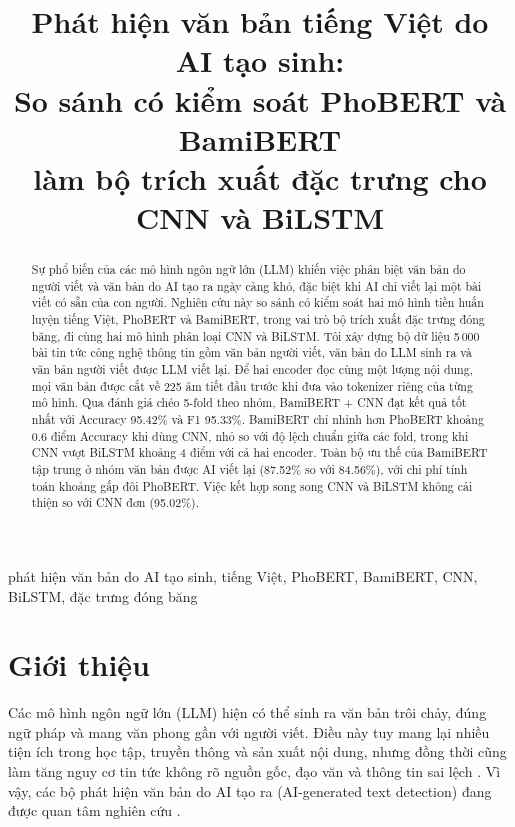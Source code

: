 \documentclass[conference,a4paper]{IEEEtran}
\begin{document}
\title{Phát hiện văn bản tiếng Việt do AI tạo sinh:\\
So sánh có kiểm soát PhoBERT và BamiBERT\\ làm bộ trích xuất đặc trưng cho CNN và BiLSTM}

\author{
}

\maketitle

\begin{abstract}
Sự phổ biến của các mô hình ngôn ngữ lớn (LLM) khiến việc phân biệt văn bản do người viết và văn bản do AI tạo ra ngày càng khó, đặc biệt khi AI chỉ viết lại một bài viết có sẵn của con người. Nghiên cứu này so sánh có kiểm soát hai mô hình tiền huấn luyện tiếng Việt, PhoBERT và BamiBERT, trong vai trò bộ trích xuất đặc trưng đóng băng, đi cùng hai mô hình phân loại CNN và BiLSTM. Tôi xây dựng bộ dữ liệu 5\,000 bài tin tức công nghệ thông tin gồm văn bản người viết, văn bản do LLM sinh ra và văn bản người viết được LLM viết lại. Để hai encoder đọc cùng một lượng nội dung, mọi văn bản được cắt về 225 âm tiết đầu trước khi đưa vào tokenizer riêng của từng mô hình. Qua đánh giá chéo 5-fold theo nhóm, BamiBERT + CNN đạt kết quả tốt nhất với Accuracy 95.42\% và F1 95.33\%. BamiBERT chỉ nhỉnh hơn PhoBERT khoảng 0.6 điểm Accuracy khi dùng CNN, nhỏ so với độ lệch chuẩn giữa các fold, trong khi CNN vượt BiLSTM khoảng 4 điểm với cả hai encoder. Toàn bộ ưu thế của BamiBERT tập trung ở nhóm văn bản được AI viết lại (87.52\% so với 84.56\%), với chi phí tính toán khoảng gấp đôi PhoBERT. Việc kết hợp song song CNN và BiLSTM không cải thiện so với CNN đơn (95.02\%).
\end{abstract}

\begin{IEEEkeywords}
phát hiện văn bản do AI tạo sinh, tiếng Việt, PhoBERT, BamiBERT, CNN, BiLSTM, đặc trưng đóng băng
\end{IEEEkeywords}

\section{Giới thiệu}
\label{sec:intro}
Các mô hình ngôn ngữ lớn (LLM) hiện có thể sinh ra văn bản trôi chảy, đúng ngữ pháp và mang văn phong gần với người viết. Điều này tuy mang lại nhiều tiện ích trong học tập, truyền thông và sản xuất nội dung, nhưng đồng thời cũng làm tăng nguy cơ tin tức không rõ nguồn gốc, đạo văn và thông tin sai lệch \cite{wu2025survey}. Vì vậy, các bộ phát hiện văn bản do AI tạo ra (AI-generated text detection) đang được quan tâm nghiên cứu \cite{wu2025survey,xiang_survey}.
\end{document}
